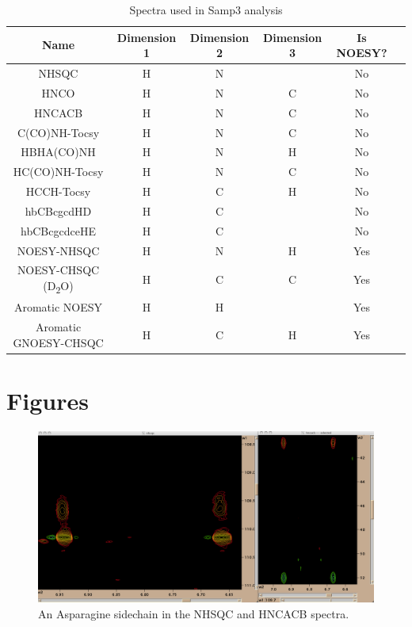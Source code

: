 \begin{table}[h]
    \begin{tabular}{ | c || c | c | c | c | c |}
    \hline
      Name  &  Dimension 1  &  Dimension 2  &  Dimension 3  &  Is NOESY?   \\
    \hline
      NHSQC         & H & N & & No  \\
    \hline
      HNCO          & H & N & C & No  \\
    \hline
      HNCACB        & H & N & C & No  \\
    \hline
      C(CO)NH-Tocsy & H & N & C & No  \\
    \hline
      HBHA(CO)NH    & H & N & H & No  \\
    \hline
      HC(CO)NH-Tocsy & H & N & C & No  \\
    \hline
      HCCH-Tocsy    & H & C & H & No  \\
    \hline
      hbCBcgcdHD    & H & C &  & No  \\
    \hline 
      hbCBcgcdceHE  & H & C &  & No \\
    \hline
      NOESY-NHSQC   & H & N & H & Yes \\
    \hline 
      NOESY-CHSQC (D\textsubscript{2}O) & H & C & C & Yes \\
    \hline 
      Aromatic NOESY & H & H &  & Yes \\
    \hline 
      Aromatic GNOESY-CHSQC & H & C & H & Yes \\
    \hline 
    \end{tabular}
    \caption{Spectra used in Samp3 analysis}
    \label{samp3_spectra}
\end{table}


\clearpage
\section{Figures}

\begin{figure}[h]
  \includegraphics[scale=0.25]{figures/asn_sidechain}
  \caption{An Asparagine sidechain in the NHSQC and HNCACB spectra.}
  \label{asn_sidechain}
\end{figure}

